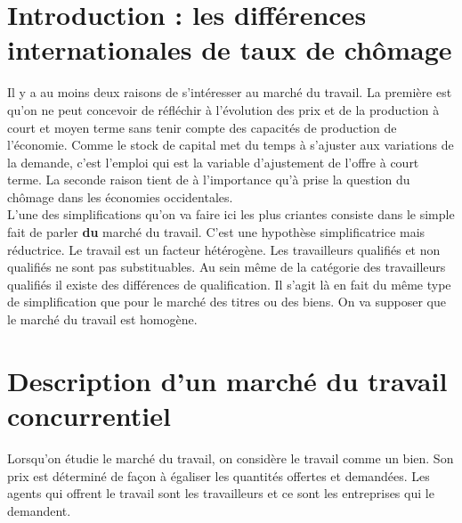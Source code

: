 \documentclass[10pt]{book}
\begin{document}
\section{Introduction : les différences internationales de taux de chômage}
Il y a au moins deux raisons de s'intéresser au marché du travail. La première est qu'on ne peut concevoir de réfléchir à l'évolution des prix et de la production à court et moyen terme sans tenir compte des capacités de production de l'économie. Comme le stock de capital met du temps à s'ajuster aux variations de la demande, c'est l'emploi qui est la variable d'ajustement de l'offre à court terme. La seconde raison tient de à l'importance qu'à prise la question du chômage dans les économies occidentales. \\
L'une des simplifications qu'on va faire ici les plus criantes consiste dans le simple fait de parler \textbf{du} marché du travail. C'est une hypothèse simplificatrice mais réductrice. Le travail est un facteur hétérogène. Les travailleurs qualifiés et non qualifiés ne sont pas substituables. Au sein même de la catégorie des travailleurs qualifiés il existe des différences de qualification. Il s'agit là en fait du même type de simplification que pour le marché des titres ou des biens. On va supposer que le marché du travail est homogène.
\section{Description d'un marché du travail concurrentiel}
Lorsqu'on étudie le marché du travail, on considère le travail comme un bien. Son prix est déterminé de façon à égaliser les quantités offertes et demandées. Les agents qui offrent le travail sont les travailleurs et ce sont les entreprises qui le demandent. \\
\end{document}
